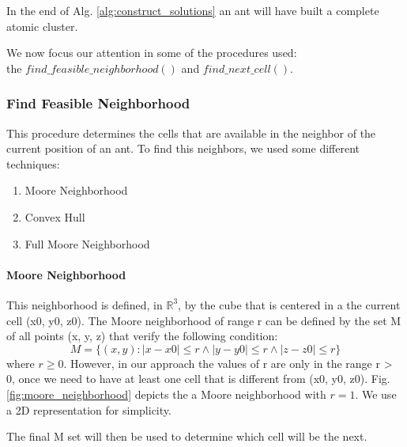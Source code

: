 	In the end of Alg. \ref{alg:construct_solutions} an ant will have built a complete atomic cluster.
	
	We now focus our attention in some of the procedures used:\\ the $find\_feasible\_neighborhood()$ and $find\_next\_cell()$. 
	
		\subsubsection*{Find Feasible Neighborhood}
		This procedure determines the cells that are available in the neighbor of the current position of an ant. To find this neighbors, we used some different techniques:
		\begin{enumerate}
			\item Moore Neighborhood
			\item Convex Hull
			\item Full Moore Neighborhood
		\end{enumerate}
	
		\paragraph*{Moore Neighborhood}
			This neighborhood is defined, in $\mathbb{R}^3$, by the cube that is centered in a the current cell (x0, y0, z0). The Moore neighborhood of range r can be defined by the set M of all points (x, y, z) that verify the following condition:
			\begin{equation}
				M= \{(x,y):|x-x0| \leq r \wedge |y-y0| \leq r \wedge |z-z0| \leq r\}
			\end{equation}
			where $r \geq 0$. However, in our approach the values of r are only in the range r > 0, once we need to have at least one cell that is different from (x0, y0, z0). Fig. \ref{fig:moore_neighborhood} depicts the a Moore neighborhood with $r = 1$. We use a 2D representation for simplicity. 
			
			
			The final M set will then be used to determine which cell will be the next.
			
